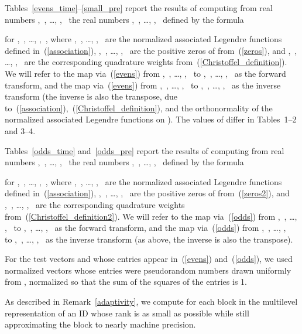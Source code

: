 \documentclass[final,3p,times]{elsarticle}
\begin{document}
Tables~\ref{evens_time}--\ref{small_pre}
report the results of computing from real numbers
,~, \dots, ,~
the real numbers ,~, \dots, ,~
defined by the formula

for ,~, \dots, ,~,
where ,~, \dots,
,~
are the normalized associated Legendre functions defined
in~(\ref{association}),
,~, \dots, ,~ are the positive zeros
of  from~(\ref{zeros}),
and ,~, \dots, ,~
are the corresponding quadrature weights from~(\ref{Christoffel_definition}).
We will refer to the map via~(\ref{evens})
from ,~, \dots, ,~
to ,~, \dots, ,~
as the forward transform, and the map via~(\ref{evens})
from ,~, \dots, ,~
to ,~, \dots, ,~
as the inverse transform (the inverse is also the transpose,
due to~(\ref{association}),~(\ref{Christoffel_definition}),
and the orthonormality of the normalized associated Legendre functions
on ).
The values of  differ in Tables~1--2 and 3--4.

Tables~\ref{odds_time} and~\ref{odds_pre} report the results
of computing from real numbers
,~, \dots, ,~
the real numbers ,~, \dots, ,~
defined by the formula

for ,~, \dots, ,~,
where ,~, \dots,
,~
are the normalized associated Legendre functions defined
in~(\ref{association}),
,~, \dots, ,~ are the positive zeros
of  from~(\ref{zeros2}),
and ,~, \dots, ,~
are the corresponding quadrature weights from~(\ref{Christoffel_definition2}).
We will refer to the map via~(\ref{odds})
from ,~, \dots, ,~
to ,~, \dots, ,~
as the forward transform, and the map via~(\ref{odds})
from ,~, \dots, ,~
to ,~, \dots, ,~
as the inverse transform (as above, the inverse is also the transpose).

For the test vectors  and  whose entries appear
in~(\ref{evens}) and~(\ref{odds}), we used normalized vectors whose entries
were pseudorandom numbers drawn uniformly from ,
normalized so that the sum of the squares of the entries is 1.

As described in Remark~\ref{adaptivity},
we compute for each block in the multilevel representation of 
an ID whose rank is as small as possible while still approximating
the block to nearly machine precision.
\end{document}
